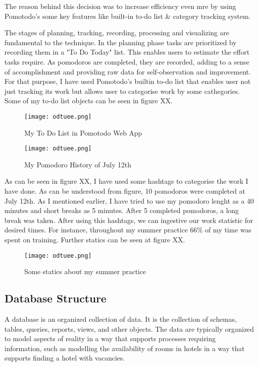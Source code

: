 	The reason behind this decision was to increase efficiency even mre by using Pomotodo's some key features like built-in to-do list \& category tracking system.
	
	The stages of planning, tracking, recording, processing and visualizing are fundamental to the technique. In the planning phase tasks are prioritized by recording them in a "To Do Today" list. This enables users to estimate the effort tasks require. As pomodoros are completed, they are recorded, adding to a sense of accomplishment and providing raw data for self-observation and improvement. For that purpose, I have used Pomotodo's builtin to-do list that enables user not just tracking its work but allows user to categorise work by some cathegories. Some of my to-do list objects can be seen in figure XX.

\begin{figure}[H]
\centering
\texttt{[image: odtuee.png]}\\
\caption{\label{fig:cooling} My To Do List in Pomotodo Web App  }
\end{figure}
	
\begin{figure}[H]
\centering
\texttt{[image: odtuee.png]}
\caption{\label{fig:cooling} My Pomodoro History of July 12th   }
\end{figure}

	As can be seen in figure XX, I have used some hashtags to categorise the work I have done. As can be understood from figure, 10 pomodoros were completed at July 12th. As I mentioned earlier, I have tried to use my pomodoro lenght as a 40 minutes and short breaks as 5 minutes. After 5 completed pomodoros, a long break was taken. After using this hashtags, we can ingestive our work statistic for desired times. For instance, throughout my summer practice 66\% of my time was spent on training. Further statics can be seen at figure XX.										

\begin{figure}[H]
\centering
\texttt{[image: odtuee.png]}\\[1cm]
\caption{\label{fig:cooling} Some statics about my summer practice   }
\end{figure}										
	
	  

\subsection{Database Structure}
\-
\indent A database is an organized collection of data. It is the collection of schemas, tables, queries, reports, views, and other objects. The data are typically organized to model aspects of reality in a way that supports processes requiring information, such as modelling the availability of rooms in hotels in a way that supports finding a hotel with vacancies.

